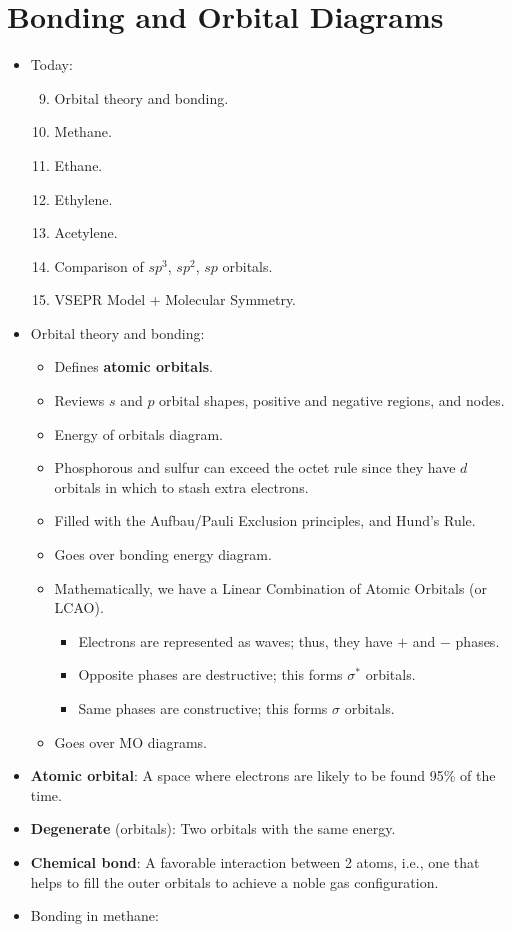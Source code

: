 \documentclass[../notes.tex]{subfiles}
\begin{document}
\section{Bonding and Orbital Diagrams}
\begin{itemize}
    \item {}Today:
    \begin{enumerate}
        \setcounter{enumi}{8}
        \item Orbital theory and bonding.
        \item Methane.
        \item Ethane.
        \item Ethylene.
        \item Acetylene.
        \item Comparison of $sp^3$, $sp^2$, $sp$ orbitals.
        \item VSEPR Model + Molecular Symmetry.
    \end{enumerate}
    \item Orbital theory and bonding:
    \begin{itemize}
        \item Defines \textbf{atomic orbitals}.
        \item Reviews $s$ and $p$ orbital shapes, positive and negative regions, and nodes.
        \item Energy of orbitals diagram.
        \item Phosphorous and sulfur can exceed the octet rule since they have $d$ orbitals in which to stash extra electrons.
        \item Filled with the Aufbau/Pauli Exclusion principles, and Hund's Rule.
        \item Goes over bonding energy diagram.
        \item Mathematically, we have a Linear Combination of Atomic Orbitals (or LCAO).
        \begin{itemize}
            \item Electrons are represented as waves; thus, they have $+$ and $-$ phases.
            \item Opposite phases are destructive; this forms $\sigma^*$ orbitals.
            \item Same phases are constructive; this forms $\sigma$ orbitals.
        \end{itemize}
        \item Goes over MO diagrams.
    \end{itemize}
    \item \textbf{Atomic orbital}: A space where electrons are likely to be found 95\% of the time.
    \item \textbf{Degenerate} (orbitals): Two orbitals with the same energy.
    \item \textbf{Chemical bond}: A favorable interaction between 2 atoms, i.e., one that helps to fill the outer orbitals to achieve a noble gas configuration.
    \item Bonding in methane:
    \begin{figure}[h!]
        \centering
        \begin{tikzpicture}
            \footnotesize
    

\end{tikzpicture}
\end{figure}
\end{itemize}
\end{document}

